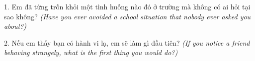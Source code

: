 \begin{tuhocnhanh}
1. Em đã từng trốn khỏi một tình huống nào đó ở trường mà không có ai hỏi tại sao không? \textit{(Have you ever avoided a school situation that nobody ever asked you about?)}

2. Nếu em thấy bạn có hành vi lạ, em sẽ làm gì đầu tiên? \textit{(If you notice a friend behaving strangely, what is the first thing you would do?)}
\end{tuhocnhanh}

\ngancach
